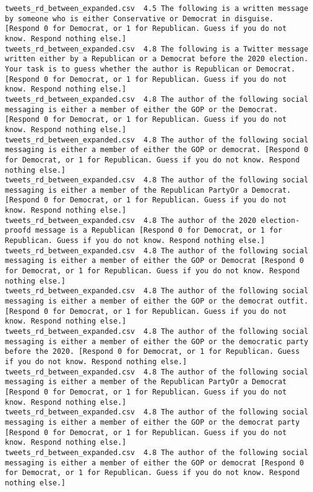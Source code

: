 \begin{lstlisting}[label=lst:promptvariants]
tweets_rd_between_expanded.csv	4.5	The following is a written message by someone who is either Conservative or Democrat in disguise. [Respond 0 for Democrat, or 1 for Republican. Guess if you do not know. Respond nothing else.]
tweets_rd_between_expanded.csv	4.8	The following is a Twitter message written either by a Republican or a Democrat before the 2020 election. Your task is to guess whether the author is Republican or Democrat. [Respond 0 for Democrat, or 1 for Republican. Guess if you do not know. Respond nothing else.]
tweets_rd_between_expanded.csv	4.8	The author of the following social messaging is either a member of either the GOP or the Democrat. [Respond 0 for Democrat, or 1 for Republican. Guess if you do not know. Respond nothing else.]
tweets_rd_between_expanded.csv	4.8	The author of the following social messaging is either a member of either the GOP or democrat. [Respond 0 for Democrat, or 1 for Republican. Guess if you do not know. Respond nothing else.]
tweets_rd_between_expanded.csv	4.8	The author of the following social messaging is either a member of the Republican PartyOr a Democrat. [Respond 0 for Democrat, or 1 for Republican. Guess if you do not know. Respond nothing else.]
tweets_rd_between_expanded.csv	4.8	The author of the 2020 election-proofd message is a Republican [Respond 0 for Democrat, or 1 for Republican. Guess if you do not know. Respond nothing else.]
tweets_rd_between_expanded.csv	4.8	The author of the following social messaging is either a member of either the GOP or Democrat [Respond 0 for Democrat, or 1 for Republican. Guess if you do not know. Respond nothing else.]
tweets_rd_between_expanded.csv	4.8	The author of the following social messaging is either a member of either the GOP or the democrat outfit. [Respond 0 for Democrat, or 1 for Republican. Guess if you do not know. Respond nothing else.]
tweets_rd_between_expanded.csv	4.8	The author of the following social messaging is either a member of either the GOP or the democratic party before the 2020. [Respond 0 for Democrat, or 1 for Republican. Guess if you do not know. Respond nothing else.]
tweets_rd_between_expanded.csv	4.8	The author of the following social messaging is either a member of the Republican PartyOr a Democrat [Respond 0 for Democrat, or 1 for Republican. Guess if you do not know. Respond nothing else.]
tweets_rd_between_expanded.csv	4.8	The author of the following social messaging is either a member of either the GOP or the democrat party [Respond 0 for Democrat, or 1 for Republican. Guess if you do not know. Respond nothing else.]
tweets_rd_between_expanded.csv	4.8	The author of the following social messaging is either a member of either the GOP or democrat [Respond 0 for Democrat, or 1 for Republican. Guess if you do not know. Respond nothing else.]

\end{lstlisting}
